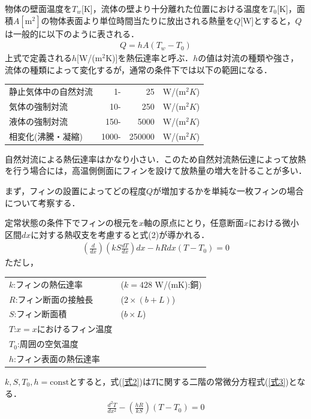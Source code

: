 \documentclass[a4paper,11pt,uplatex]{jsarticle}
\begin{document}
\par
物体の壁面温度を$T_w$[K]，流体の壁より十分離れた位置における温度を$T_0$[K]，面積$A[\mathrm{m^2}]$の物体表面より単位時間当たりに放出される熱量を$Q$[W]とすると，$Q$は一般的に以下のように表される．
\begin{align}
  Q=hA(T_w-T_0)
\end{align}
上式で定義される$h$[W/($\mathrm{m^2}$K)]を熱伝達率と呼ぶ．$h$の値は対流の種類や強さ，流体の種類によって変化するが，通常の条件下では以下の範囲になる．
\begin{table}[H]
\begin{tabular}{lrrl}
静止気体中の自然対流 & 1-    & 25     &  W/($\mathrm{m^2}K$)\\
気体の強制対流    & 10-   & 250    &  W/($\mathrm{m^2}K$)\\
液体の強制対流    & 150-  & 5000   &  W/($\mathrm{m^2}K$)\\
相変化(沸騰・凝縮) & 1000- & 250000 & W/($\mathrm{m^2}K$)
\end{tabular}
\end{table}
自然対流による熱伝達率はかなり小さい．このため自然対流熱伝達によって放熱を行う場合には，高温側側面にフィンを設けて放熱量の増大を計ることが多い．
\par
まず，フィンの設置によってどの程度$Q$が増加するかを単純な一枚フィンの場合について考察する．
\par
定常状態の条件下でフィンの根元を$x$軸の原点にとり，任意断面$x$における微小区間$dx$に対する熱収支を考慮すると式(2)が導かれる．
\begin{align}
  \label{式2}
  \left( \frac{d}{dx}\right) \left(kS \frac{dT}{dx}\right)dx - hRdx(T-T_0)=0
\end{align}
ただし，
\begin{table}[H]
\begin{tabular}{ll}
$k$:フィンの熱伝達率 & ($k = 428$ W/(mK):銅) \\
$R$:フィン断面の接触長 & ($2 \times (b+L)$) \\
$S$:フィン断面積 & ($b \times L$) \\
$T$:$x=x$におけるフィン温度 & \\
$T_0$:周囲の空気温度 & \\
$h$:フィン表面の熱伝達率 &
\end{tabular}
\end{table}
$k,S,T_0,h=\mathrm{const}$とすると，式(\ref{式2})は$T$に関する二階の常微分方程式(\ref{式3})となる．
\begin{align}
  \label{式3}
  \frac{d^2T}{dx^2} - \left(\frac{hR}{kS}\right)(T-T_0)=0
\end{align}
\end{document}
